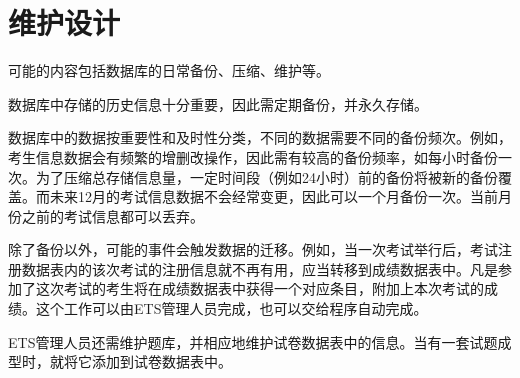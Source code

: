 \chapter{维护设计}
可能的内容包括数据库的日常备份、压缩、维护等。

数据库中存储的历史信息十分重要，因此需定期备份，并永久存储。

数据库中的数据按重要性和及时性分类，不同的数据需要不同的备份频次。例如，考生信息数据会有频繁的增删改操作，因此需有较高的备份频率，如每小时备份一次。为了压缩总存储信息量，一定时间段（例如24小时）前的备份将被新的备份覆盖。而未来12月的考试信息数据不会经常变更，因此可以一个月备份一次。当前月份之前的考试信息都可以丢弃。

除了备份以外，可能的事件会触发数据的迁移。例如，当一次考试举行后，考试注册数据表内的该次考试的注册信息就不再有用，应当转移到成绩数据表中。凡是参加了这次考试的考生将在成绩数据表中获得一个对应条目，附加上本次考试的成绩。这个工作可以由ETS管理人员完成，也可以交给程序自动完成。

ETS管理人员还需维护题库，并相应地维护试卷数据表中的信息。当有一套试题成型时，就将它添加到试卷数据表中。